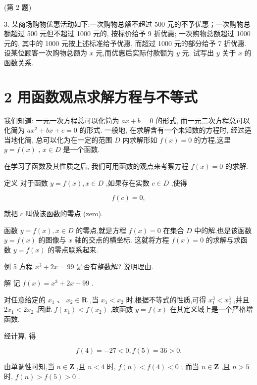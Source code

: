 \documentclass[10pt]{article}
\begin{document}
(第 2 题)

3. 某商场购物优惠活动如下:一次购物总额不超过 500 元的不予优惠；一次购物总额超过 500 元但不超过 1000 元的, 按标价给予 9 折优惠; 一次购物总额超过 1000 元的, 其中的 1000 元按上述标准给予优惠, 而超过 1000 元的部分给予 7 折优惠. 设某位顾客一次购物总额为 \(x\) 元,而优惠后实际付款额为 \(y\) 元. 试写出 \(y\) 关于 \(x\) 的函数关系.

\section*{2 用函数观点求解方程与不等式}

我们知道: 一元一次方程总可以化简为 \({ax} + b = 0\) 的形式, 而一元二次方程总可以化简为 \(a{x}^{2} + {bx} + c = 0\) 的形式. 一般地, 在求解含有一个未知数的方程时, 经过适当地化简, 总可以化为在一定的范围 \(D\) 内求解形如 \(f\left( x\right)  = 0\) 的方程,这里 \(y = f\left( x\right)\) , \(x \in  D\) 是一个函数.

在学习了函数及其性质之后, 我们可用函数的观点来考察方程 \(f\left( x\right)  = 0\) 的求解.

定义 对于函数 \(y = f\left( x\right) ,x \in  D\) ,如果存在实数 \(c \in  D\) ,使得

\[
f\left( c\right)  = 0,
\]

就把 \(c\) 叫做该函数的零点 (zero).

函数 \(y = f\left( x\right) ,x \in  D\) 的零点,就是方程 \(f\left( x\right)  = 0\) 在集合 \(D\) 中的解,也是该函数 \(y = f\left( x\right)\) 的图像与 \(x\) 轴的交点的横坐标. 这就将方程 \(f\left( x\right)  = 0\) 的求解与求函数 \(y = f\left( x\right)\) 的零点联系起来.

例 5 方程 \({x}^{3} + {2x} = {99}\) 是否有整数解? 说明理由.

解 记 \(f\left( x\right)  = {x}^{3} + {2x} - {99}\) .

对任意给定的 \({x}_{1}\text{ 、 }{x}_{2} \in  \mathbf{R}\) ,当 \({x}_{1} < {x}_{2}\) 时,根据不等式的性质,可得 \({x}_{1}^{3} < {x}_{2}^{3}\) ,并且 \(2{x}_{1} < 2{x}_{2}\) ,因此 \(f\left( {x}_{1}\right)  < f\left( {x}_{2}\right)\) ,故函数 \(y = f\left( x\right)\) 在其定义域上是一个严格增函数.

经计算, 得

\[
f\left( 4\right)  =  - {27} < 0,f\left( 5\right)  = {36} > 0.
\]

由单调性可知,当 \(n \in  \mathbf{Z}\) ,且 \(n < 4\) 时, \(f\left( n\right)  < f\left( 4\right)  < 0\) ; 而当 \(n \in  \mathbf{Z}\) ,且 \(n > 5\) 时, \(f\left( n\right)  > f\left( 5\right)  > 0\) .
\end{document}

